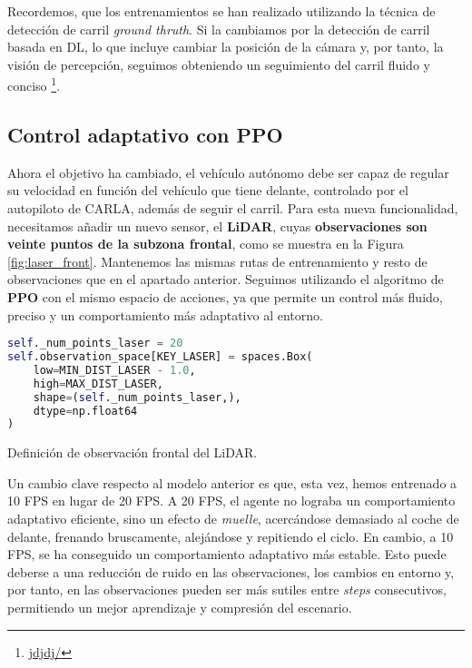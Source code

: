 Recordemos, que los entrenamientos se han realizado utilizando la técnica de detección de carril \textit{ground thruth}. Si la cambiamos por la detección de carril basada en \ac{DL}, lo que incluye cambiar la posición de la cámara y, por tanto, la visión de percepción, seguimos obteniendo un seguimiento del carril fluido y conciso \footnote{\url{jdjdj/}}.

\subsection{Control adaptativo con PPO}

Ahora el objetivo ha cambiado, el vehículo autónomo debe ser capaz de regular su velocidad en función del vehículo que tiene delante, controlado por el autopiloto de CARLA, además de seguir el carril. Para esta nueva funcionalidad, necesitamos añadir un nuevo sensor, el \textbf{\ac{LiDAR}}, cuyas \textbf{observaciones son veinte puntos de la subzona frontal}, como se muestra en la Figura \ref{fig:laser_front}. Mantenemos las mismas rutas de entrenamiento y resto de observaciones que en el apartado anterior. Seguimos utilizando el algoritmo de \textbf{\ac{PPO}} con el mismo espacio de acciones, ya que permite un control más fluido, preciso y un comportamiento más adaptativo al entorno. 

\begin{code}[h]
\begin{lstlisting}[language=Python]
self._num_points_laser = 20
self.observation_space[KEY_LASER] = spaces.Box(
	low=MIN_DIST_LASER - 1.0,
	high=MAX_DIST_LASER,
	shape=(self._num_points_laser,),
	dtype=np.float64
)
\end{lstlisting}
\caption[Definición de observación frontal del \ac{LiDAR}]{Definición de observación frontal del \ac{LiDAR}.}
\label{cod:obs_laser_front}
\end{code}

Un cambio clave respecto al modelo anterior es que, esta vez, hemos entrenado a 10 \ac{FPS} en lugar de 20 \ac{FPS}. A 20 \ac{FPS}, el agente no lograba un comportamiento adaptativo eficiente, sino un efecto de \textit{muelle}, acercándose demasiado al coche de delante, frenando bruscamente, alejándose y repitiendo el ciclo. En cambio, a 10 \ac{FPS}, se ha conseguido un comportamiento adaptativo más estable. Esto puede deberse a una reducción de ruido en las observaciones, los cambios en entorno y, por tanto, en las observaciones pueden ser más sutiles entre \textit{steps} consecutivos, permitiendo un mejor aprendizaje y compresión del escenario.

